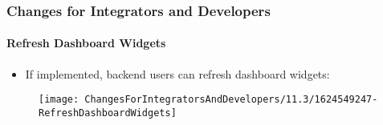 %

\begin{frame}[fragile]
	\frametitle{Changes for Integrators and Developers}
	\framesubtitle{Refresh Dashboard Widgets}


	\begin{itemize}
		\item If implemented, backend users can refresh dashboard widgets:
	\end{itemize}

	\begin{figure}
		\texttt{[image: ChangesForIntegratorsAndDevelopers/11.3/1624549247-RefreshDashboardWidgets]}
	\end{figure}

\end{frame}

